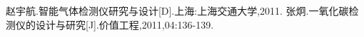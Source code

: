 \begin{thebibliography}{0}
	 赵宇航.智能气体检测仪研究与设计[D].上海:上海交通大学,2011.
	 张炯.一氧化碳检测仪的设计与研究[J].价值工程,2011,04:136-139.
\end{thebibliography}